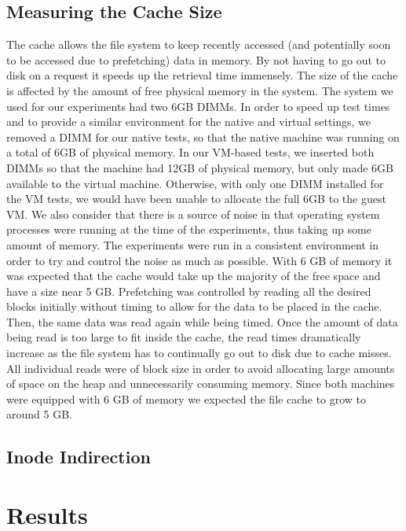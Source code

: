 \documentclass[letterpaper,twocolumn,10pt]{article}
\begin{document}
\subsection{Measuring the Cache Size}
The cache allows the file system to keep recently accessed (and potentially soon to be accessed due to prefetching) data in memory. 
By not having to go out to disk on a request it speeds up the retrieval time immensely. 
The size of the cache is affected by the amount of free physical memory in the system. 
The system we used for our experiments had two 6GB DIMMs. 
In order to speed up test times and to provide a similar environment for the native and virtual settings, we removed a DIMM for our native tests, so that the native machine was running on a total of 6GB of physical memory. 
In our VM-based tests, we inserted both DIMMs so that the machine had 12GB of physical memory, but only made 6GB available to the virtual machine. 
Otherwise, with only one DIMM installed for the VM tests, we would have been unable to allocate the full 6GB to the guest VM.
We also consider that there is a source of noise in that operating system processes were running at the time of the experiments, thus taking up some amount of memory.
The experiments were run in a consistent environment in order to try and control the noise as much as possible. 
With 6 GB of memory it was expected that the cache would take up the majority of the free space and have a size near 5 GB. 
Prefetching was controlled by reading all the desired blocks initially without timing to allow for the data to be placed in the cache. 
Then, the same data was read again while being timed. 
Once the amount of data being read is too large to fit inside the cache, the read times dramatically increase as the file system has to continually go out to disk due to cache misses. 
All individual reads were of block size in order to avoid allocating large amounts of space on the heap and unnecessarily consuming memory.
Since both machines were equipped with 6 GB of memory we expected the file cache to grow to around 5 GB.

\subsection{Inode Indirection}
\section{Results}
\end{document}
